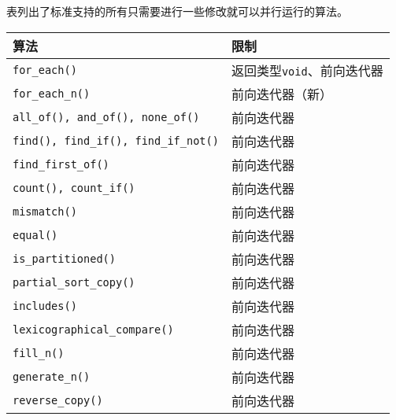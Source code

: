 表列出了标准支持的所有只需要进行一些修改就可以并行运行的算法。
\begin{table}[ht]
    \centering
    \begin{tabular}{l|l}
        \hline
        \textbf{算法}                                                         & \textbf{限制}             \\
        \hline
        \texttt{for\_each()}                                                & 返回类型\texttt{void}、前向迭代器 \\
        \texttt{for\_each\_n()}                                             & 前向迭代器（新）                \\
        \texttt{all\_of(), and\_of(), none\_of()}                           & 前向迭代器                   \\
        \texttt{find(), find\_if(), find\_if\_not()}                        & 前向迭代器                   \\
        \texttt{find\_first\_of()}                                          & 前向迭代器                   \\
        \texttt{count(), count\_if()}                                       & 前向迭代器                   \\
        \texttt{mismatch()}                                                 & 前向迭代器                   \\
        \texttt{equal()}                                                    & 前向迭代器                   \\
        \texttt{is\_partitioned()}                                          & 前向迭代器                   \\
        \texttt{partial\_sort\_copy()}                                      & 前向迭代器                   \\
        \texttt{includes()}                                                 & 前向迭代器                   \\
        \texttt{lexicographical\_compare()}                                 & 前向迭代器                   \\
        \texttt{fill\_n()}                                                  & 前向迭代器                   \\
        \texttt{generate\_n()}                                              & 前向迭代器                   \\
        \texttt{reverse\_copy()}                                            & 前向迭代器                   \\

\end{tabular}
\end{table}
